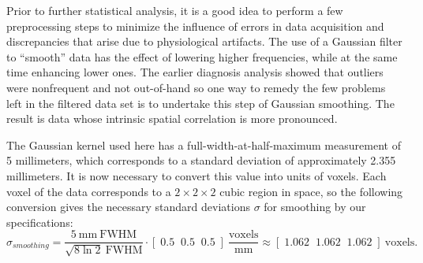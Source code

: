 
\par Prior to further statistical analysis, it is a good idea to perform a few
preprocessing steps to minimize the influence of errors in data acquisition and
discrepancies that arise due to physiological artifacts. The use of a Gaussian
filter to ``smooth'' data has the effect of lowering higher frequencies, while
at the same time enhancing lower ones. The earlier diagnosis analysis showed
that outliers were nonfrequent and not out-of-hand so one way to remedy the few
problems left in the filtered data set is to undertake this step of Gaussian
smoothing. The result is data whose intrinsic spatial correlation is more
pronounced.

\par \indent The Gaussian kernel used here has a full-width-at-half-maximum
measurement of 5 millimeters, which corresponds to a standard deviation of
approximately 2.355 millimeters. It is now necessary to convert this value into
units of voxels. Each voxel of the data corresponds to a $2 \times 2 \times 2$
cubic region in space, so the following conversion gives the necessary standard
deviations $\sigma$ for smoothing by our specifications:
\[
\sigma_{smoothing} = \frac{ 5 \ \mathrm{ mm \ FWHM } }{ \sqrt{ 8 \ln{ 2 } } \
\mathrm{ FWHM } } \cdot \left[ \; 0.5 \; \; 0.5 \; \; 0.5 \; \right] \
\frac{ \mathrm{ voxels } }{ \mathrm{ mm } } \approx
\left[ \; 1.062 \; \; 1.062 \; \; 1.062 \; \right] \ \mathrm{ voxels } .
\]
